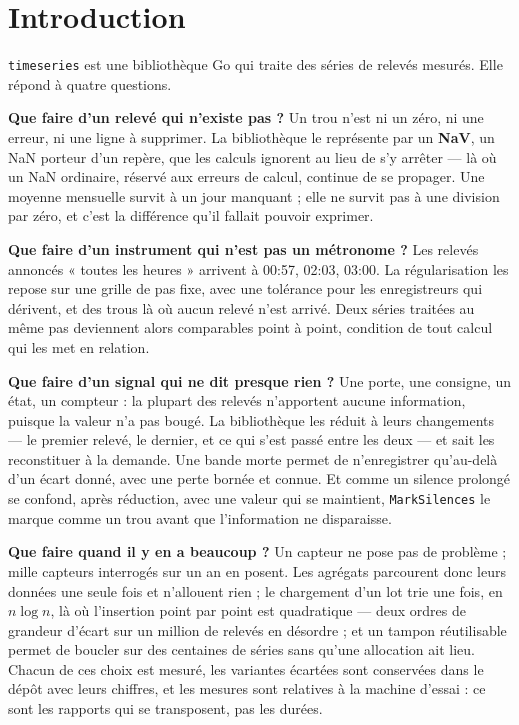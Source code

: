 \documentclass[11pt,a4paper]{report}
\begin{document}
\tableofcontents

\listoftables

\chapter{Introduction}\label{chap:introduction}

\texttt{timeseries} est une bibliothèque Go qui traite des séries de
relevés mesurés. Elle répond à quatre questions.

\textbf{Que faire d'un relevé qui n'existe pas ?} Un trou n'est ni un
zéro, ni une erreur, ni une ligne à supprimer. La bibliothèque le
représente par un \textbf{NaV}, un NaN porteur d'un repère, que les
calculs ignorent au lieu de s'y arrêter --- là où un NaN ordinaire,
réservé aux erreurs de calcul, continue de se propager. Une moyenne
mensuelle survit à un jour manquant ; elle ne survit pas à une division
par zéro, et c'est la différence qu'il fallait pouvoir exprimer.

\textbf{Que faire d'un instrument qui n'est pas un métronome ?} Les
relevés annoncés « toutes les heures » arrivent à 00:57, 02:03, 03:00.
La régularisation les repose sur une grille de pas fixe, avec une
tolérance pour les enregistreurs qui dérivent, et des trous là où aucun
relevé n'est arrivé. Deux séries traitées au même pas deviennent alors
comparables point à point, condition de tout calcul qui les met en
relation.

\textbf{Que faire d'un signal qui ne dit presque rien ?} Une porte, une
consigne, un état, un compteur : la plupart des relevés n'apportent
aucune information, puisque la valeur n'a pas bougé. La bibliothèque les
réduit à leurs changements --- le premier relevé, le dernier, et ce qui
s'est passé entre les deux --- et sait les reconstituer à la demande.
Une bande morte permet de n'enregistrer qu'au-delà d'un écart donné,
avec une perte bornée et connue. Et comme un silence prolongé se
confond, après réduction, avec une valeur qui se maintient,
\texttt{MarkSilences} le marque comme un trou avant que l'information ne
disparaisse.

\textbf{Que faire quand il y en a beaucoup ?} Un capteur ne pose pas de
problème ; mille capteurs interrogés sur un an en posent. Les agrégats
parcourent donc leurs données une seule fois et n'allouent rien ; le
chargement d'un lot trie une fois, en \(n\log n\), là où l'insertion
point par point est quadratique --- deux ordres de grandeur d'écart sur
un million de relevés en désordre ; et un tampon réutilisable permet de
boucler sur des centaines de séries sans qu'une allocation ait lieu.
Chacun de ces choix est mesuré, les variantes écartées sont conservées
dans le dépôt avec leurs chiffres, et les mesures sont relatives à la
machine d'essai : ce sont les rapports qui se transposent, pas les
durées.
\end{document}
